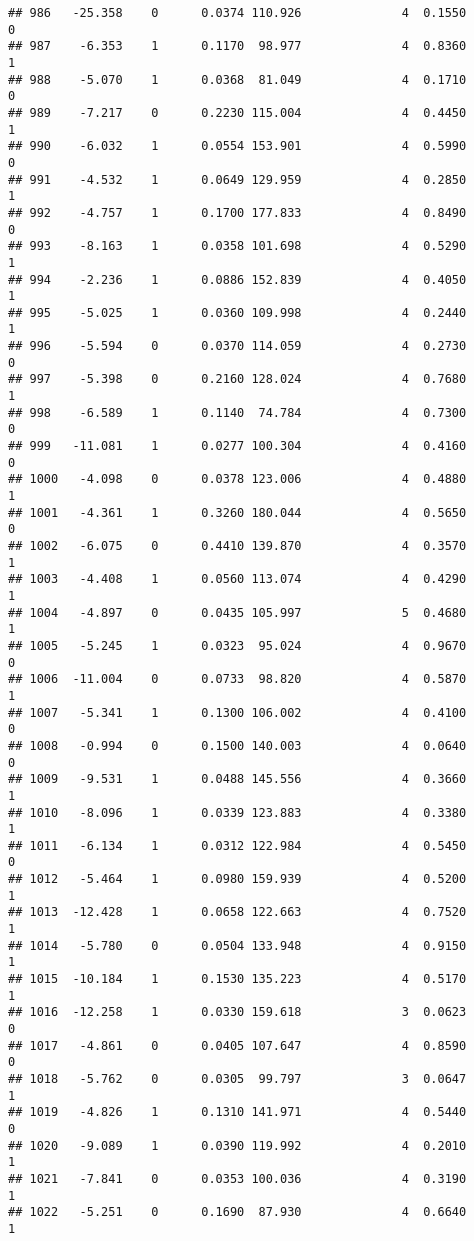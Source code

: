 \documentclass[
]{article}
\begin{document}
\begin{verbatim}
## 986   -25.358    0      0.0374 110.926              4  0.1550      0
## 987    -6.353    1      0.1170  98.977              4  0.8360      1
## 988    -5.070    1      0.0368  81.049              4  0.1710      0
## 989    -7.217    0      0.2230 115.004              4  0.4450      1
## 990    -6.032    1      0.0554 153.901              4  0.5990      0
## 991    -4.532    1      0.0649 129.959              4  0.2850      1
## 992    -4.757    1      0.1700 177.833              4  0.8490      0
## 993    -8.163    1      0.0358 101.698              4  0.5290      1
## 994    -2.236    1      0.0886 152.839              4  0.4050      1
## 995    -5.025    1      0.0360 109.998              4  0.2440      1
## 996    -5.594    0      0.0370 114.059              4  0.2730      0
## 997    -5.398    0      0.2160 128.024              4  0.7680      1
## 998    -6.589    1      0.1140  74.784              4  0.7300      0
## 999   -11.081    1      0.0277 100.304              4  0.4160      0
## 1000   -4.098    0      0.0378 123.006              4  0.4880      1
## 1001   -4.361    1      0.3260 180.044              4  0.5650      0
## 1002   -6.075    0      0.4410 139.870              4  0.3570      1
## 1003   -4.408    1      0.0560 113.074              4  0.4290      1
## 1004   -4.897    0      0.0435 105.997              5  0.4680      1
## 1005   -5.245    1      0.0323  95.024              4  0.9670      0
## 1006  -11.004    0      0.0733  98.820              4  0.5870      1
## 1007   -5.341    1      0.1300 106.002              4  0.4100      0
## 1008   -0.994    0      0.1500 140.003              4  0.0640      0
## 1009   -9.531    1      0.0488 145.556              4  0.3660      1
## 1010   -8.096    1      0.0339 123.883              4  0.3380      1
## 1011   -6.134    1      0.0312 122.984              4  0.5450      0
## 1012   -5.464    1      0.0980 159.939              4  0.5200      1
## 1013  -12.428    1      0.0658 122.663              4  0.7520      1
## 1014   -5.780    0      0.0504 133.948              4  0.9150      1
## 1015  -10.184    1      0.1530 135.223              4  0.5170      1
## 1016  -12.258    1      0.0330 159.618              3  0.0623      0
## 1017   -4.861    0      0.0405 107.647              4  0.8590      0
## 1018   -5.762    0      0.0305  99.797              3  0.0647      1
## 1019   -4.826    1      0.1310 141.971              4  0.5440      0
## 1020   -9.089    1      0.0390 119.992              4  0.2010      1
## 1021   -7.841    0      0.0353 100.036              4  0.3190      1
## 1022   -5.251    0      0.1690  87.930              4  0.6640      1

\end{verbatim}
\end{document}
